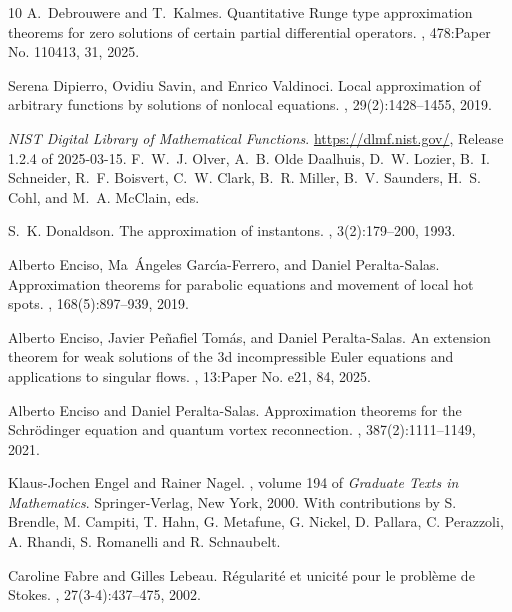 \documentclass[11pt,a4paper]{article}
\numberwithin{equation}{section}
\begin{document}
\begin{thebibliography}{10}
A.~Debrouwere and T.~Kalmes.
\newblock Quantitative {R}unge type approximation theorems for zero solutions of certain partial differential operators.
, 478:Paper No. 110413, 31, 2025.

Serena Dipierro, Ovidiu Savin, and Enrico Valdinoci.
\newblock Local approximation of arbitrary functions by solutions of nonlocal equations.
, 29(2):1428--1455, 2019.

{\it NIST Digital Library of Mathematical Functions}.
\newblock \url{https://dlmf.nist.gov/}, Release 1.2.4 of 2025-03-15.
\newblock F.~W.~J. Olver, A.~B. {Olde Daalhuis}, D.~W. Lozier, B.~I. Schneider, R.~F. Boisvert, C.~W. Clark, B.~R. Miller, B.~V. Saunders, H.~S. Cohl, and M.~A. McClain, eds.

S.~K. Donaldson.
\newblock The approximation of instantons.
, 3(2):179--200, 1993.

Alberto Enciso, Ma~\'{A}ngeles Garc\'{\i}a-Ferrero, and Daniel Peralta-Salas.
\newblock Approximation theorems for parabolic equations and movement of local hot spots.
, 168(5):897--939, 2019.

Alberto Enciso, Javier Pe\~nafiel Tom\'as, and Daniel Peralta-Salas.
\newblock An extension theorem for weak solutions of the 3d incompressible {E}uler equations and applications to singular flows.
, 13:Paper No. e21, 84, 2025.

Alberto Enciso and Daniel Peralta-Salas.
\newblock Approximation theorems for the {S}chr\"odinger equation and quantum vortex reconnection.
, 387(2):1111--1149, 2021.

Klaus-Jochen Engel and Rainer Nagel.
, volume 194 of {\em Graduate Texts in Mathematics}.
\newblock Springer-Verlag, New York, 2000.
\newblock With contributions by S. Brendle, M. Campiti, T. Hahn, G. Metafune, G. Nickel, D. Pallara, C. Perazzoli, A. Rhandi, S. Romanelli and R. Schnaubelt.

Caroline Fabre and Gilles Lebeau.
\newblock R\'egularit\'e{} et unicit\'e{} pour le probl\`eme de {S}tokes.
, 27(3-4):437--475, 2002.


\end{thebibliography}
\end{document}
